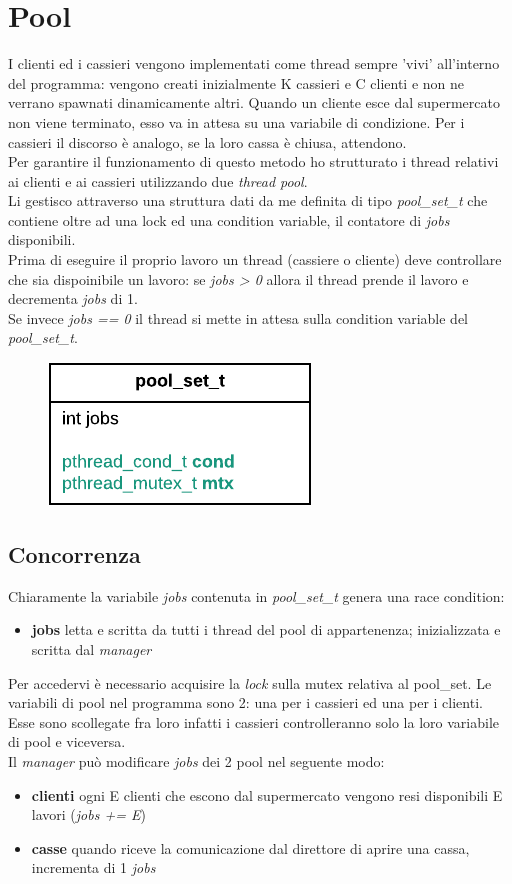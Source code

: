 \documentclass[11pt, a4paper]{article}
\begin{document}
\section{Pool}
I clienti ed i cassieri vengono implementati come thread sempre 'vivi' all'interno del programma: vengono creati inizialmente K cassieri e C clienti e non ne verrano spawnati dinamicamente altri. Quando un cliente esce dal supermercato non viene terminato, esso va in attesa su una variabile di condizione. Per i cassieri il discorso è analogo, se la loro cassa è chiusa, attendono.\\
Per garantire il funzionamento di questo metodo ho strutturato i thread relativi ai clienti e ai cassieri utilizzando due \textit{thread pool}. \\Li gestisco attraverso una struttura dati da me definita di tipo \textit{pool\_set\_t} che contiene oltre ad una lock ed una condition variable, il contatore di \textit{jobs} disponibili.\\
Prima di eseguire il proprio lavoro un thread (cassiere o cliente) deve controllare che sia dispoinibile un lavoro: se \textit{jobs > 0} allora il thread prende il lavoro e decrementa \textit{jobs} di 1. \\ Se invece \textit{jobs == 0} il thread si mette in attesa sulla condition variable del \textit{pool\_set\_t}.
\begin{figure}[h]
	\centering
	\includegraphics[scale=1]{pool_res.png}
	\label{fig:0}
\end{figure}
\subsection{Concorrenza}
Chiaramente la variabile \textit{jobs} contenuta in \textit{pool\_set\_t} genera una race condition:
\begin{itemize}
\item \textbf{jobs}	letta e scritta da tutti i thread del pool di appartenenza; inizializzata e scritta dal \textit{manager}
\end{itemize} 
Per accedervi è necessario acquisire la \textit{lock} sulla mutex relativa al pool\_set. 
Le variabili di pool nel programma sono 2: una per i cassieri ed una per i clienti. Esse sono scollegate fra loro infatti i cassieri controlleranno solo la loro variabile di pool e viceversa.\\
Il \textit{manager} può modificare \textit{jobs} dei 2 pool nel seguente modo:
\begin{itemize}
\item \textbf{clienti}	ogni E clienti che escono dal supermercato vengono resi disponibili E lavori (\textit{jobs += E})
\item \textbf{casse}	quando riceve la comunicazione dal direttore di aprire una cassa, incrementa di 1 \textit{jobs}
\end{itemize}
\end{document}
